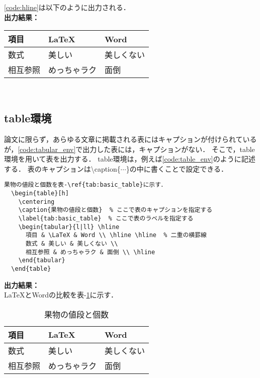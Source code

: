 \code\ref{code:hline}は以下のように出力される．
\\ \noindent\textbf{出力結果：}\hrulefill \vspace{2mm}\\
  \vspace{2mm}
  \begin{tabular}{l|ll} \hline
    項目 & \LaTeX & Word \\ \hline \hline  %
    数式 & 美しい & 美しくない \\ \cline{1-1}
    相互参照 & めっちゃラク & 面倒 \\ \hline
  \end{tabular}
\\\noindent\hrulefill  

\subsection{table環境}

論文に限らず，あらゆる文章に掲載される表にはキャプションが付けられているが，\code\ref{code:tabular_env}で出力した表には，キャプションがない．
そこで，table環境を用いて表を出力する．
table環境は，例えば\code\ref{code:table_env}のように記述する．
表のキャプションは\textbackslash caption\{$\cdots$\}の中に書くことで設定できる．

\begin{lstlisting}[caption=基本の表,label=code:table_env]
  果物の値段と個数を表-\ref{tab:basic_table}に示す．  
  \begin{table}[h]
    \centering
    \caption{果物の値段と個数}  % ここで表のキャプションを指定する
    \label{tab:basic_table}  % ここで表のラベルを指定する
    \begin{tabular}{l|ll} \hline
      項目 & \LaTeX & Word \\ \hline \hline  % 二重の横罫線
      数式 & 美しい & 美しくない \\ 
      相互参照 & めっちゃラク & 面倒 \\ \hline
    \end{tabular}
  \end{table}
\end{lstlisting}


\noindent\textbf{出力結果：}\hrulefill\\
\LaTeX とWordの比較を表-\ref{tab:basic_table}に示す．  
\begin{table}[h]
  \centering
  \caption{果物の値段と個数}  %
  \label{tab:basic_table}  %
  \begin{tabular}{l|ll} \hline
    項目 & \LaTeX & Word \\ \hline \hline  %
    数式 & 美しい & 美しくない \\ 
    相互参照 & めっちゃラク & 面倒 \\ \hline
  \end{tabular}
\end{table}
\\\noindent\hrulefill  

